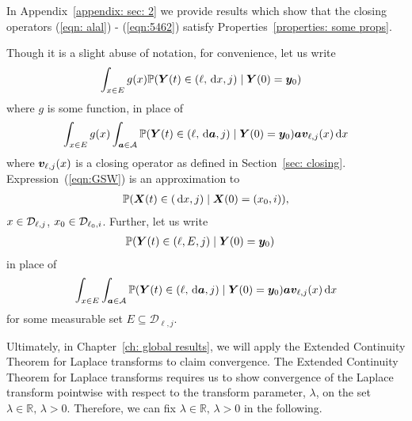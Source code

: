 In Appendix~\ref{appendix: sec: 2} we provide results which show that the closing operators (\ref{eqn: alal}) - (\ref{eqn:5462}) satisfy Properties~\ref{properties: some props}. 

Though it is a slight abuse of notation, for convenience, let us write 
\begin{align*}
	& \int_{x\in E}g(x)\mathbb P({\boldsymbol Y}(t) \in (\ell,\, \mathrm{d} x, j)\mid \boldsymbol Y(0)=\boldsymbol y_0 )
\end{align*}
where \(g\) is some function, in place of 
\begin{align}
	\int_{x\in E}g(x)\int_{\boldsymbol a \in\mathcal A}\mathbb P({\boldsymbol Y}(t) \in (\ell,\, \mathrm{d} \boldsymbol a, j)\mid \boldsymbol Y(0)=\boldsymbol y_0)\boldsymbol a\boldsymbol v_{\ell,j}(x)\, \mathrm{d} x \label{eqn:GSW}
\end{align}
where \(\boldsymbol v_{\ell,j}(x)\) is a closing operator as defined in Section~\ref{sec: closing}. Expression~(\ref{eqn:GSW}) is an approximation to 
\begin{align}
	\mathbb P(\boldsymbol X(t)\in(\, \mathrm{d} x, j)\mid \boldsymbol X(0)=(x_0, i)),
\end{align}
\(x\in \mathcal{D}_{\ell,j}\), \(x_0\in\mathcal{D}_{\ell_0,i}\).
Further, let us write 
\begin{align*}
	& \mathbb P({\boldsymbol Y} (t) \in (\ell,E, j)\mid \boldsymbol Y (0)=\boldsymbol y_0 )
\end{align*}
in place of 
\begin{align}
	\int_{x\in E}\int_{\boldsymbol a \in\mathcal A}\mathbb P({\boldsymbol Y} (t) \in (\ell,\, \mathrm{d} \boldsymbol a, j)\mid \boldsymbol Y (0)=\boldsymbol y_0  )\boldsymbol a\boldsymbol v_{\ell,j}(x)\, \mathrm{d} x \label{eqn:GSW2}
\end{align}
for some measurable set \(E\subseteq \mathcal D_{\ell,j}\). 

Ultimately, in Chapter~\ref{ch: global results}, we will apply the Extended Continuity Theorem for Laplace transforms \cite[Chapter XIII, Theorem 2a]{feller1957} to claim convergence. The Extended Continuity Theorem for Laplace transforms requires us to show convergence of the Laplace transform pointwise with respect to the transform parameter, \(\lambda\), on the set \(\lambda\in\mathbb R,\, \lambda>0\). Therefore, we can fix \(\lambda\in\mathbb R,\, \lambda>0\) in the following. 

